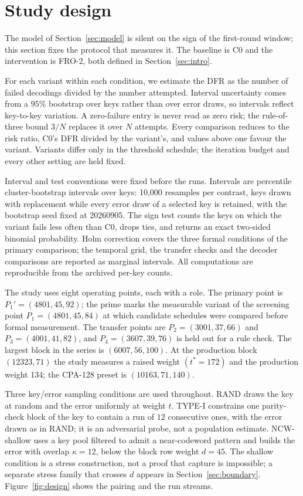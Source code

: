 \section{Study design}\label{sec:method}

The model of Section~\ref{sec:model} is silent on the sign of the first-round window; this section fixes the protocol that measures it. The baseline is C0 and the intervention is FRO-2, both defined in Section~\ref{sec:intro}.

For each variant within each condition, we estimate the DFR as the number of failed decodings divided by the number attempted. Interval uncertainty comes from a $95\%$ bootstrap over keys rather than over error draws, so intervals reflect key-to-key variation. A zero-failure entry is never read as zero risk; the rule-of-three bound $3/N$ replaces it over $N$ attempts. Every comparison reduces to the risk ratio, C0's DFR divided by the variant's, and values above one favour the variant. Variants differ only in the threshold schedule; the iteration budget and every other setting are held fixed.

Interval and test conventions were fixed before the runs. Intervals are percentile cluster-bootstrap intervals over keys: 10{,}000 resamples per contrast, keys drawn with replacement while every error draw of a selected key is retained, with the bootstrap seed fixed at 20260905. The sign test counts the keys on which the variant fails less often than C0, drops ties, and returns an exact two-sided binomial probability. Holm correction covers the three formal conditions of the primary comparison; the temporal grid, the transfer checks and the decoder comparisons are reported as marginal intervals. All computations are reproducible from the archived per-key counts.

The study uses eight operating points, each with a role. The primary point is $P_1'=(4801,45,92)$; the prime marks the measurable variant of the screening point $P_1=(4801,45,84)$ at which candidate schedules were compared before formal measurement. The transfer points are $P_2=(3001,37,66)$ and $P_3=(4001,41,82)$, and $P_4=(3607,39,76)$ is held out for a rule check. The largest block in the series is $(6007,56,100)$. At the production block $(12323,71)$ the study measures a raised weight $(t^{\ast}=172)$ and the production weight 134; the CPA-128 preset is $(10163,71,140)$.

Three key/error sampling conditions are used throughout. RAND draws the key at random and the error uniformly at weight $t$. TYPE-I constrains one parity-check block of the key to contain a run of $12$ consecutive ones, with the error drawn as in RAND; it is an adversarial probe, not a population estimate. NCW-shallow uses a key pool filtered to admit a near-codeword pattern and builds the error with overlap $\kappa=12$, below the block row weight $d=45$. The shallow condition is a stress construction, not a proof that capture is impossible; a separate stress family that crosses $d$ appears in Section~\ref{sec:boundary}. Figure~\ref{fig:design} shows the pairing and the run streams.

